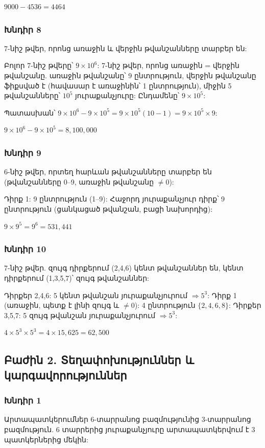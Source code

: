 $\boxed{9000 - 4536 = 4464}$

\subsubsection*{Խնդիր 8}
7-նիշ թվեր, որոնց առաջին և վերջին թվանշանները տարբեր են:

Բոլոր 7-նիշ թվերը՝ $9\times 10^6$:
7-նիշ թվեր, որոնց առաջին = վերջին թվանշանը. առաջին թվանշանը՝ 9 ընտրություն, վերջին թվանշանը ֆիքսված է (հավասար է առաջինին՝ 1 ընտրություն), միջին 5 թվանշանները՝ $10^5$ յուրաքանչյուրը: Ընդամենը՝ $9\times 10^5$:

Պատասխան՝ $9\times 10^6 - 9\times 10^5 = 9\times 10^5(10-1)=9\times 10^5\times 9$:

$\boxed{9\times 10^6 - 9\times 10^5 = 8{,}100{,}000}$

\subsubsection*{Խնդիր 9}
6-նիշ թվեր, որտեղ հարևան թվանշանները տարբեր են (թվանշանները 0--9, առաջին թվանշանը $\neq 0$):

Դիրք 1: 9 ընտրություն (1--9): Հաջորդ յուրաքանչյուր դիրք՝ 9 ընտրություն (ցանկացած թվանշան, բացի նախորդից):

$\boxed{9 \times 9^5 = 9^6 = 531{,}441}$

\subsubsection*{Խնդիր 10}
7-նիշ թվեր. զույգ դիրքերում (2,4,6) կենտ թվանշաններ են, կենտ դիրքերում (1,3,5,7)՝ զույգ թվանշաններ:

Դիրքեր 2,4,6: 5 կենտ թվանշան յուրաքանչյուրում $\Rightarrow 5^3$:
Դիրք 1 (առաջին, պետք է լինի զույգ և $\neq 0$): 4 ընտրություն $\{2,4,6,8\}$:
Դիրքեր 3,5,7: 5 զույգ թվանշան յուրաքանչյուրում $\Rightarrow 5^3$:

$\boxed{4 \times 5^3 \times 5^3 = 4 \times 15{,}625 = 62{,}500}$

\subsection*{Բաժին 2. Տեղափոխություններ և կարգավորություններ}

\subsubsection*{Խնդիր 1}
Արտապատկերումներ 6-տարրանոց բազմությունից 3-տարրանոց բազմություն. 6 տարրերից յուրաքանչյուրը արտապատկերվում է 3 պատկերներից մեկին:


